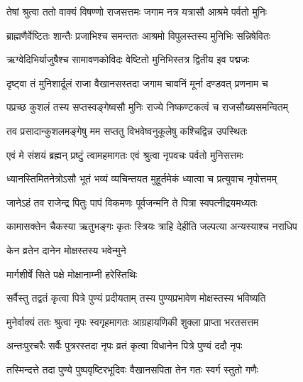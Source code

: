 \twolineshloka
{तेषां श्रुत्वा ततो वाक्यं विषण्णो राजसत्तमः}
{जगाम नत्र यत्रासौ आश्रमे पर्वतो मुनिः} %

\twolineshloka
{ब्राह्मणैर्वेष्टितः शान्तैः प्रजाभिश्च समन्ततः}
{आश्रमो विपुलस्तस्य मुनिभिः सन्निषेवितः} %

\twolineshloka
{ऋग्वेदिभिर्याजुषैश्च सामावणकोविदः}
{वेष्टितो मुनिभिस्तत्र द्वितीय इव पद्मजः} %

\twolineshloka
{दृष्ट्वा तं मुनिशार्दूलं राजा वैखानसस्तदा}
{जगाम चावनिं मूर्ना दण्डवत् प्रणनाम च} %

\twolineshloka
{पप्रच्छ कुशलं तस्य सप्तस्वङ्गेष्वसौ मुनिः}
{राज्ये निष्कण्टकत्वं च राजसौख्यसमन्वितम्} %


\twolineshloka
{तव प्रसादान्कुशलमङ्गेषु मम सप्ततु}
{विभवेष्वनुकूलेषु कश्चिद्विन्न उपस्थितः} %

\twolineshloka
{एवं मे संशयं ब्रह्मन् प्रष्टुं त्वामहमागतः}
{एवं श्रुत्वा नृपवचः पर्वतो मुनिसत्तमः} %

\twolineshloka
{ध्यानस्तिमितनेत्रोऽसौ भूतं भव्यं व्यचिन्तयत}
{मुहूर्तमेकं ध्यात्वा च प्रत्युवाच नृपोत्तमम्} %


\twolineshloka
{जानेऽहं तव राजेन्द्र पितुः पापं विकमणः}
{पूर्वजन्मनि ते पित्रा स्वपत्नीद्रयमध्यतः} %

\twolineshloka
{कामासक्तेन चैकस्या ऋतुभङ्गः कृतः स्त्रियः}
{त्राहि देहीति जल्पत्या अन्यस्याश्च नराधिप} %



\onelineshloka
{केन व्रतेन दानेन मोक्षस्तस्य भवेन्मुने} %



\onelineshloka
{मार्गशीर्षे सिते पक्षे मोक्षानाम्नी हरेस्तिथिः} %

\twolineshloka
{सर्वैस्तु तद्वतं कृत्वा पित्रे पुण्यं प्रदीयताम्}
{तस्य पुण्यप्रभावेण मोक्षस्तस्य भविष्यति} %

\twolineshloka
{मुनेर्वाक्यं ततः श्रुत्वा नृपः स्वगृहमागतः}
{आग्रहायणिकी शुक्ला प्राप्ता भरतसत्तम} %

\twolineshloka
{अन्तःपुरचरैः सर्वैः पुत्ररस्तदा नृपः}
{व्रतं कृत्वा विधानेन पित्रे पुण्यं ददौ नृपः} %

\twolineshloka
{तस्मिन्दत्ते तदा पुण्ये पुष्पवृष्टिरभूदिवः}
{वैखानसपिता तेन गतः स्वर्ग स्तुतो गणैः} %

